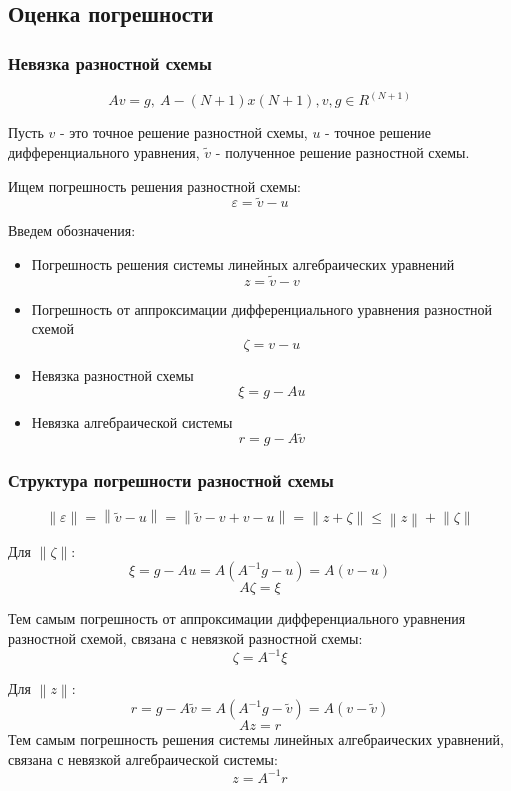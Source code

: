 \subsection{Оценка погрешности}

\subsubsection{Невязка разностной схемы}

\[
  Av = g,\ A - (N + 1) x (N + 1), v, g \in R^{(N + 1)}
\]

Пусть $ v $ - это точное решение разностной схемы, $ u $ -  точное решение дифференциального уравнения, 
$ \tilde{v} $ - полученное решение разностной схемы.

Ищем погрешность решения разностной схемы:
\[
  \varepsilon = \tilde{v} - u
\]

Введем обозначения:
\begin{itemize}
  \item Погрешность решения системы линейных алгебраических уравнений
  \[ z = \tilde{v} - v \]
  \item Погрешность от аппроксимации дифференциального уравнения разностной схемой
  \[ \zeta = v - u \]
  \item Невязка разностной схемы
  \[ \xi = g - Au \]
  \item Невязка алгебраической системы
  \[ r = g - A\tilde{v} \]
\end{itemize}

\subsubsection{Структура погрешности разностной схемы}
\[
  \left\lVert \varepsilon \right\rVert = \left\lVert \tilde{v} - u \right\rVert =
  \left\lVert \tilde{v} - v + v - u \right\rVert = \left\lVert z + \zeta  \right\rVert \leq \left\lVert z \right\rVert
  + \left\lVert \zeta \right\rVert 
\]

Для $\left\lVert \zeta\right\rVert$:
\[
  \xi = g - Au = A(A^{-1}g - u) = A(v - u)
\]
\[
  A\zeta  = \xi
\]

Тем самым погрешность от аппроксимации дифференциального уравнения разностной схемой, связана с невязкой разностной схемы:
\[
  \zeta = A^{-1} \xi 
\]

Для $\left\lVert z \right\rVert$:
\[
  r = g - A\tilde{v} = A(A^{-1}g - \tilde{v}) = A(v - \tilde{v})
\]
\[
  Az = r
\]
Тем самым погрешность решения системы линейных алгебраических уравнений, связана с невязкой алгебраической системы:
\[
  z = A^{-1}r
\]

